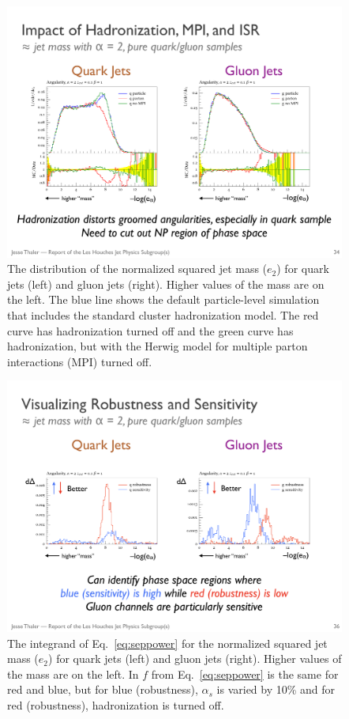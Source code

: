 \begin{figure}[h!]
\begin{center}
\includegraphics[width = 0.99\columnwidth]{figures/robustness.pdf}
\end{center}
\caption{The distribution of the normalized squared jet mass ($e_2$) for quark jets (left) and gluon jets (right).  Higher values of the mass are on the left.  The blue line shows the default particle-level simulation that includes the standard cluster hadronization model.  The red curve has hadronization turned off and the green curve has hadronization, but with the Herwig model for multiple parton interactions (MPI) turned off.}
\label{fig:robustness}
\end{figure}

\begin{figure}[h!]
\begin{center}
\includegraphics[width = 0.99\columnwidth]{figures/differentialseparation.pdf}
\end{center}
\caption{The integrand of Eq.~\ref{eq:seppower} for the normalized squared jet mass ($e_2$) for quark jets (left) and gluon jets (right).  Higher values of the mass are on the left.  In $f$ from Eq.~\ref{eq:seppower} is the same for red and blue, but for blue (robustness), $\alpha_s$ is varied by 10\% and for red (robustness), hadronization is turned off.}
\label{fig:differentialseparation}
\end{figure}

